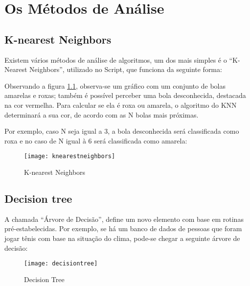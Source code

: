 \chapter{Os Métodos de Análise}
\label{chapter:os_metodos_de_analise}

\section{\textbf{K-nearest Neighbors}}

Existem vários métodos de análise de algoritmos, um dos mais simples é o “K-Nearest Neighbors”, utilizado no Script, que funciona da seguinte forma:

Observando a figura \ref{fig:knearestneighbors}, observa-se um gráfico com um conjunto de bolas amarelas e roxas; também é possível perceber uma bola desconhecida, destacada na cor vermelha. Para calcular se ela é roxa ou amarela, o algoritmo do KNN determinará a sua cor, de acordo com as N bolas mais próximas.

Por exemplo, caso N seja igual a 3, a bola desconhecida será classificada como roxa e no caso de N igual à 6 será classificada como amarela:

\begin{figure}[!htb]
\begin{center}
\caption{K-nearest Neighbors}
\texttt{[image: knearestneighbors]}
\label{fig:knearestneighbors}
\end{center}
\cite{KNN}
\end{figure}




\section{\textbf{Decision tree}}

A chamada “Árvore de Decisão”, define um novo elemento com base em rotinas pré-estabelecidas. Por exemplo, se há um banco de dados de pessoas que foram jogar tênis com base na situação do clima, pode-se chegar a seguinte árvore de decisão:


\begin{figure}[!htb]
\begin{center}
\caption{Decision Tree}
\texttt{[image: decisiontree]}
\end{center}
\cite{ARVOREDECISAO}
\end{figure}

